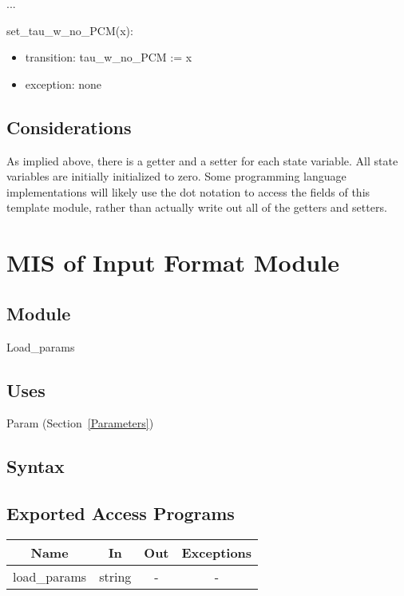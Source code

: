 \documentclass[12pt]{article}
\begin{document}
...

\noindent set\_tau\_w\_no\_PCM(x):
\begin{itemize}
\item transition: tau\_w\_no\_PCM := x
\item exception: none
\end{itemize}

\subsection{Considerations}

As implied above, there is a getter and a setter for each state variable.  All
state variables are initially initialized to zero.  Some programming language
implementations will likely use the dot notation to access the fields of this
template module, rather than actually write out all of the getters and setters.

\newpage
\section{MIS of Input Format Module} \label{Load}

\subsection{Module}

Load\_params

\subsection{Uses}

Param (Section~\ref{Parameters})

\subsection{Syntax}

\subsection{Exported Access Programs}

\begin{center}
\begin{tabular}{c c c c}
\hline
\textbf{Name} & \textbf{In} & \textbf{Out} & \textbf{Exceptions} \\
\hline
load\_params & string & - &  - \\
\hline
\end{tabular}
\end{center}
\end{document}
